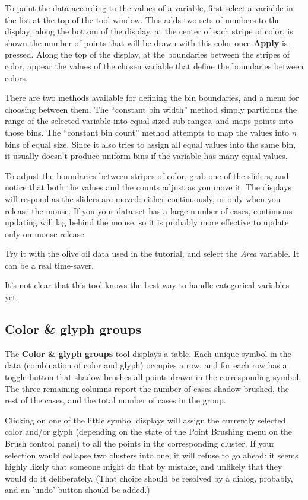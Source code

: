 \documentclass[11pt]{article}
\def\Widget#1{\textbf{#1}}
\begin{document}
To paint the data according to the values of a variable, first select
a variable in the list at the top of the tool window.  This adds two
sets of numbers to the display: along the bottom of the display, at
the center of each stripe of color, is shown the number of points that
will be drawn with this color once \Widget{Apply} is pressed.  Along
the top of the display, at the boundaries between the stripes of
color, appear the values of the chosen variable that define the
boundaries between colors.

There are two methods available for defining the bin boundaries, and
a menu for choosing between them.  The ``constant bin width'' method
simply partitions the range of the selected variable into equal-sized
sub-ranges, and maps points into those bins.  The ``constant bin
count'' method attempts to map the values into $n$ bins of equal
size.  Since it also tries to assign all equal values into the same
bin, it usually doesn't produce uniform bins if the variable has many
equal values.

To adjust the boundaries between stripes of color, grab one of the
sliders, and notice that both the values and the counts adjust as you
move it.  The displays will respond as the sliders are moved:  either
continuously, or only when you release the mouse.  If you your data set
has a large number of cases, continuous updating will lag behind the
mouse, so it is probably more effective to update only on mouse release.

Try it with the olive oil data used in the tutorial, and select the {\it
Area} variable.  It can be a real time-saver.

It's not clear that this tool knows the best way to handle categorical
variables yet.

\subsection{Color \& glyph groups}
\label{slbl:ColorAndGlyphGroups}

The \Widget{Color \& glyph groups} tool displays a table.  Each unique
symbol in the data (combination of color and glyph) occupies a row,
and for each row has a toggle button that shadow brushes all points
drawn in the corresponding symbol.  The three remaining columns
report the number of cases shadow brushed, the rest of the cases, and
the total number of cases in the group.

Clicking on one of the little symbol displays will assign the
currently selected color and/or glyph (depending on the state of the
Point Brushing menu on the Brush control panel) to all the points in
the corresponding cluster.  If your selection would collapse two
clusters into one, it will refuse to go ahead:  it seems highly
likely that someone might do that by mistake, and unlikely that they
would do it deliberately.  (That choice should be resolved by a
dialog, probably, and an 'undo' button should be added.)
\end{document}
